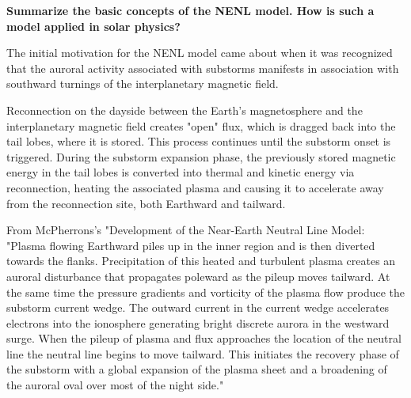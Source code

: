 \textbf{Summarize the basic concepts of the NENL model. How is such a
model applied in solar physics?}

The initial motivation for the NENL model came about when it was
recognized that the auroral activity associated with substorms manifests
in association with southward turnings of the interplanetary magnetic
field. 

Reconnection on the dayside between the Earth's magnetosphere and the
interplanetary magnetic field creates "open" flux, which is dragged back
into the tail lobes, where it is stored. This process continues until
the substorm onset is triggered. During the substorm expansion phase,
the previously stored magnetic energy in the tail lobes is converted
into thermal and kinetic energy via reconnection, heating the associated plasma and
causing it to accelerate away from the reconnection site, both Earthward
and tailward.

From McPherrons's "Development of the Near-Earth Neutral Line Model:
"Plasma flowing Earthward piles up in the inner region and is then
diverted towards the flanks. Precipitation of this heated and turbulent
plasma creates an auroral disturbance that propagates poleward as the
pileup moves tailward. At the same time the pressure gradients and
vorticity of the plasma flow produce the substorm current wedge. The
outward current in the current wedge accelerates electrons into the
ionosphere generating bright discrete aurora in the westward surge. When
the pileup of plasma and flux approaches the location of the neutral
line the neutral line begins to move tailward. This initiates the
recovery phase of the substorm with a global expansion of the plasma
sheet and a broadening of the auroral oval over most of the night side."
